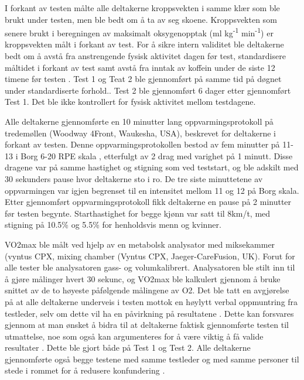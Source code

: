 \documentclass[
]{book}
\begin{document}
I forkant av testen målte alle deltakerne kroppsvekten i samme klær som ble brukt under testen, men ble bedt om å ta av seg skoene. Kroppsvekten som senere brukt i beregningen av maksimalt oksygenopptak (ml kg\textsuperscript{-1} min\textsuperscript{-1}) er kroppsvekten målt i forkant av test. For å sikre intern validitet ble deltakerne bedt om å avstå fra anstrengende fysisk aktivitet dagen før test, standardisere måltidet i forkant av test samt avstå fra inntak av koffein under de siste 12 timene før testen \citep{halperin2015} . Test 1 og Teat 2 ble gjennomført på samme tid på døgnet under standardiserte forhold.. Test 2 ble gjennomført 6 dager etter gjennomført Test 1. Det ble ikke kontrollert for fysisk aktivitet mellom testdagene.

Alle deltakerne gjennomførte en 10 minutter lang oppvarmingsprotokoll på tredemøllen (Woodway 4Front, Waukesha, USA), beskrevet for deltakerne i forkant av testen. Denne oppvarmingsprotokollen bestod av fem minutter på 11-13 i Borg 6-20 RPE skala \citep{borg1982}, etterfulgt av 2 drag med varighet på 1 minutt. Disse dragene var på samme hastighet og stigning som ved teststart, og ble adskilt med 30 sekunders pause hvor deltakerne sto i ro. De tre siste minuttetene av oppvarmingen var igjen begrenset til en intensitet mellom 11 og 12 på Borg skala. Etter gjennomført oppvarmingsprotokoll fikk deltakerne en pause på 2 minutter før testen begynte. Starthastighet for begge kjønn var satt til 8km/t, med stigning på 10.5\% og 5.5\% for henholdsvis menn og kvinner.

VO2max ble målt ved hjelp av en metabolsk analysator med miksekammer (vyntus CPX, mixing chamber (Vyntus CPX, Jaeger-CareFusion, UK). Forut for alle tester ble analysatoren gass- og volumkalibrert. Analysatoren ble stilt inn til å gjøre målinger hvert 30 sekunc, og VO2max ble kalkulert gjennom å bruke snittet av de to høyeste påfølgende målingene av O2. Det ble tatt en avgjørelse på at alle deltakerne underveis i testen mottok en høylytt verbal oppmuntring fra testleder, selv om dette vil ha en påvirkning på resultatene \citep{halperin2015}. Dette kan forsvares gjennom at man ønsket å bidra til at deltakerne faktisk gjennomførte testen til utmattelse, noe som også kan argumenteres for å være viktig å få valide resultater \citep[\citet{tønnessen2017}]{halperin2015}. Dette ble gjort både på Test 1 og Test 2. Alle deltakerne gjennomførte også begge testene med samme testleder og med samme personer til stede i rommet for å redusere konfundering \citep{halperin2015}.
\end{document}
